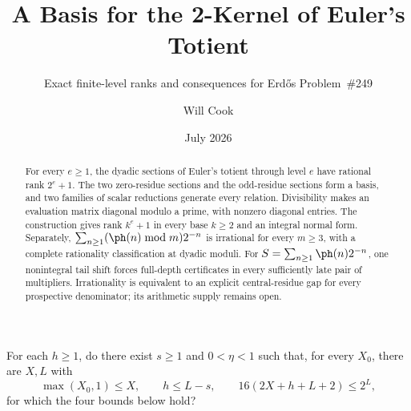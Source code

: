 \documentclass[11pt]{article}
\title{A Basis for the 2-Kernel of Euler's Totient}
\subtitle{Exact finite-level ranks and consequences for Erd\H{o}s
Problem~\#249}
\author{Will Cook}
\date{July 2026}
\begin{document}
\maketitle
\noteprovenance

\begin{problem}
\label{prob:firstharmonic}
For each $h\ge1$, do there exist $s\ge1$ and $0<\eta<1$ such that, for every
$X_0$, there are $X,L$ with
\[
 \max(X_0,1)\le X,\qquad h\le L-s,\qquad
 16(2X+h+L+2)\le2^L,
\]
for which the four bounds below hold?
\end{problem}

\begin{abstract}
For every $e\ge1$, the dyadic sections of Euler's totient through level $e$
have rational rank $2^e+1$. The two zero-residue sections and the odd-residue
sections form a basis, and two families of scalar reductions generate every relation.
Divisibility makes an evaluation matrix diagonal modulo a prime, with nonzero
diagonal entries. The construction gives rank $k^e+1$ in every base $k\ge2$
and an integral normal form.
Separately, $\sum_{n\ge1}(\ph(n)\bmod m)2^{-n}$ is irrational for every
$m\ge3$, with a complete rationality classification at dyadic moduli.
For $S=\sum_{n\ge1}\ph(n)2^{-n}$, one nonintegral tail shift forces
full-depth certificates in every sufficiently late pair of multipliers.
Irrationality is equivalent to an explicit central-residue gap for every
prospective denominator; its arithmetic supply remains open.
\end{abstract}
\end{document}
